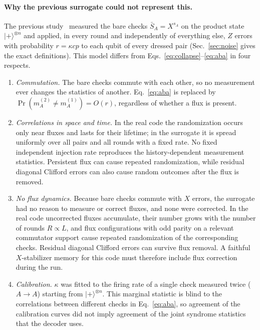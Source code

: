 \documentclass[a4paper]{article}
\providecommand{\ket}[1]{\ensuremath{|#1\rangle}}
\begin{document}
\paragraph{Why the previous surrogate could not represent this.}
The previous study~\cite{haga2026aqis} measured the bare checks $\bar S_A=X^{s_A}$ on the product state $\ket{+}^{\otimes n}$ and applied, in every round and independently of everything else, $Z$ errors with probability $r=\kappa cp$ to each qubit of every dressed pair (Sec.~\ref{sec:noise} gives the exact definitions). This model differs from Eqs.~\eqref{eq:collapse}--\eqref{eq:aba} in four respects.
\begin{enumerate}[leftmargin=*,itemsep=0pt]
\item \emph{Commutation.} The bare checks commute with each other, so no measurement ever changes the statistics of another. Eq.~\eqref{eq:aba} is replaced by $\Pr(m_A^{(2)}\neq m_A^{(1)})=O(r)$, regardless of whether a flux is present.
\item \emph{Correlations in space and time.} In the real code the randomization occurs only near fluxes and lasts for their lifetime; in the surrogate it is spread uniformly over all pairs and all rounds with a fixed rate. No fixed independent injection rate reproduces the history-dependent measurement statistics. Persistent flux can cause repeated randomization, while residual diagonal Clifford errors can also cause random outcomes after the flux is removed.
\item \emph{No flux dynamics.} Because bare checks commute with $X$ errors, the surrogate had no reason to measure or correct fluxes, and none were corrected. In the real code uncorrected fluxes accumulate, their number grows with the number of rounds $R\propto L$, and flux configurations with odd parity on a relevant commutator support cause repeated randomization of the corresponding checks. Residual diagonal Clifford errors can survive flux removal. A faithful $X$-stabilizer memory for this code must therefore include flux correction during the run.
\item \emph{Calibration.} $\kappa$ was fitted to the firing rate of a single check measured twice ($A\to A$) starting from $\ket{+}^{\otimes n}$. This marginal statistic is blind to the correlations between different checks in Eq.~\eqref{eq:aba}, so agreement of the calibration curves did not imply agreement of the joint syndrome statistics that the decoder uses.
\end{enumerate}
\end{document}
